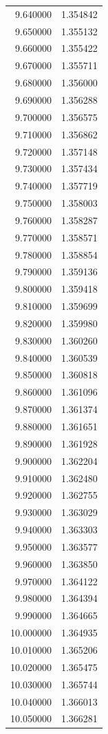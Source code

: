 \begin{tabular}{rr}
9.640000 & 1.354842 \\
9.650000 & 1.355132 \\
9.660000 & 1.355422 \\
9.670000 & 1.355711 \\
9.680000 & 1.356000 \\
9.690000 & 1.356288 \\
9.700000 & 1.356575 \\
9.710000 & 1.356862 \\
9.720000 & 1.357148 \\
9.730000 & 1.357434 \\
9.740000 & 1.357719 \\
9.750000 & 1.358003 \\
9.760000 & 1.358287 \\
9.770000 & 1.358571 \\
9.780000 & 1.358854 \\
9.790000 & 1.359136 \\
9.800000 & 1.359418 \\
9.810000 & 1.359699 \\
9.820000 & 1.359980 \\
9.830000 & 1.360260 \\
9.840000 & 1.360539 \\
9.850000 & 1.360818 \\
9.860000 & 1.361096 \\
9.870000 & 1.361374 \\
9.880000 & 1.361651 \\
9.890000 & 1.361928 \\
9.900000 & 1.362204 \\
9.910000 & 1.362480 \\
9.920000 & 1.362755 \\
9.930000 & 1.363029 \\
9.940000 & 1.363303 \\
9.950000 & 1.363577 \\
9.960000 & 1.363850 \\
9.970000 & 1.364122 \\
9.980000 & 1.364394 \\
9.990000 & 1.364665 \\
10.000000 & 1.364935 \\
10.010000 & 1.365206 \\
10.020000 & 1.365475 \\
10.030000 & 1.365744 \\
10.040000 & 1.366013 \\
10.050000 & 1.366281 \\

\end{tabular}
